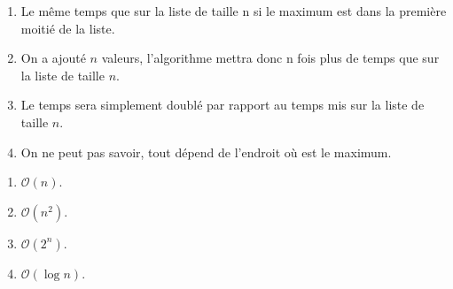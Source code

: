 \begin{multicols}{2}

\begin{enumerate}
\item Le même temps que sur la liste de taille n si le maximum est dans la première moitié de la liste.
\item On a ajouté $n$ valeurs, l'algorithme mettra donc n fois plus de temps que sur la liste de taille $n$.
\item Le temps sera simplement doublé par rapport au temps mis sur la liste de taille $n$.%
\item On ne peut pas savoir, tout dépend de l'endroit où est le maximum.
\end{enumerate}


\begin{enumerate}
\item $\mathcal{O}(n)$.
\item $\mathcal{O}\left(n^2\right)$.%
\item $\mathcal{O}\left(2^n\right)$.
\item $\mathcal{O}\left(\log n\right)$.
\end{enumerate}

\end{multicols}

